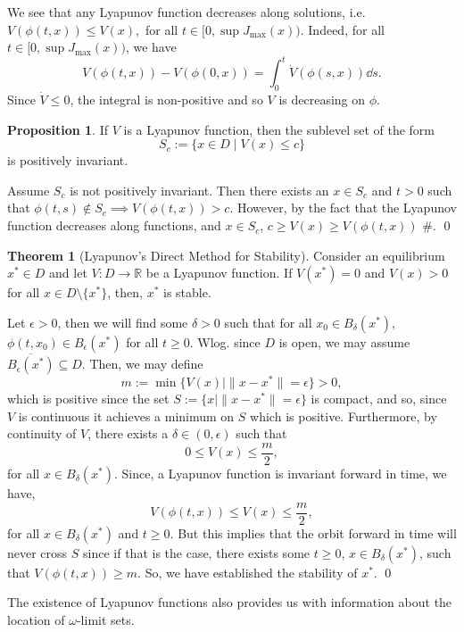 \documentclass[
]{article}
\theoremstyle{definition}
\newtheorem{theorem}{Theorem}
\newtheorem{prop}{Proposition}
\theoremstyle{definition}
\begin{document}
We see that any Lyapunov function decreases along solutions,
i.e.~\(V(\phi(t, x)) \le V(x),\) for all
\(t \in [0, \sup J_{\max}(x))\). Indeed, for all
\(t \in [0, \sup J_{\max}(x))\), we have
\[V(\phi(t, x)) - V(\phi(0, x)) = \int_0^t \dot V(\phi(s, x)) \dd s.\]
Since \(\dot V \le 0\), the integral is non-positive and so \(V\) is
decreasing on \(\phi\).

\begin{prop}
  If \(V\) is a Lyapunov function, then the sublevel set of the form 
  \[S_c := \{x \in D \mid V(x) \le c\}\]
  is positively invariant.
\end{prop}
\proof

Assume \(S_c\) is not positively invariant. Then there exists an
\(x \in S_c\) and \(t > 0\) such that
\(\phi(t, s) \not\in S_c \implies V(\phi(t, x)) > c\). However, by the
fact that the Lyapunov function decreases along functions, and
\(x \in S_c\), \(c \ge V(x) \ge V(\phi(t, x))\) \#. \qed

\begin{theorem}[Lyapunov's Direct Method for Stability]
  Consider an equilibrium \(x^* \in D\) and let \(V : D \to \mathbb{R}\) be a 
  Lyapunov function. If \(V(x^*) = 0\) and \(V(x) > 0\) for all \(x \in D \setminus \{x^*\}\), 
  then, \(x^*\) is stable.
\end{theorem}
\proof

Let \(\epsilon > 0\), then we will find some \(\delta > 0\) such that
for all \(x_0 \in B_\delta(x^*)\), \(\phi(t, x_0) \in B_\epsilon(x^*)\)
for all \(t \ge 0\). Wlog. since \(D\) is open, we may assume
\(\overline{B_\epsilon(x^*)} \subseteq D\). Then, we may define
\[m := \min \{V(x) \mid \|x - x^*\| = \epsilon\} > 0,\] which is
positive since the set \(S := \{x \mid \|x - x^*\| = \epsilon\}\) is
compact, and so, since \(V\) is continuous it achieves a minimum on
\(S\) which is positive. Furthermore, by continuity of \(V\), there
exists a \(\delta \in (0, \epsilon)\) such that
\[0 \le V(x) \le \frac{m}{2},\] for all \(x \in B_\delta(x^*)\). Since,
a Lyapunov function is invariant forward in time, we have,
\[V(\phi(t, x)) \le V(x) \le \frac{m}{2},\] for all
\(x \in B_\delta(x^*)\) and \(t \ge 0\). But this implies that the orbit
forward in time will never cross \(S\) since if that is the case, there
exists some \(t \ge 0\), \(x \in B_\delta(x^*)\), such that
\(V(\phi(t, x)) \ge m\). So, we have established the stability of
\(x^*\). \qed

The existence of Lyapunov functions also provides us with information
about the location of \(\omega\)-limit sets.
\end{document}
